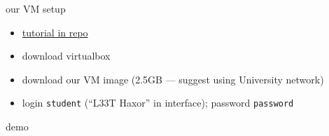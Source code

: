 \begin{frame}{our VM setup}
    \begin{itemize}
        \item \href{https://markfloryan.github.io/pdr/tutorials/01-intro-unix/virtual-box.html}{tutorial in repo}
        \item download virtualbox
        \item download our VM image (2.5GB --- suggest using University network)
        \item login \texttt{student} (``L33T Haxor'' in interface); password \texttt{password}
    \end{itemize}
\end{frame}

\begin{frame}{demo}
\end{frame}
